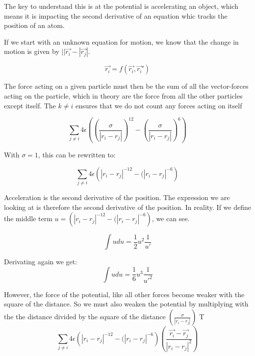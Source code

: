 The key to understand this is at the potential is accelerating an object, which means it is impacting the second derivative of an equation whic tracks the position of an atom.

If we start with an unknown equation for motion, we know that the change in motion is given by $|| \vec{r_i}  - | \vec{r_j}  | $. 

\begin{equation}
\vec{r_i} = f(\vec{r_i}, \vec{r_i}')
\end{equation}


The force acting on a given particle must then be the sum of all the vector-forces acting on the particle, which in theory are the force from all the other particles except itself. The $k \neq i$ ensures that we do not count any forces acting on itself

\begin{equation}
  \sum_{j \neq i} 4\epsilon \left(   (\frac{\sigma}{| r_i - r_j | })^{12} -   (\frac{\sigma}{| r_i - r_j | })^6 \right)
\end{equation}

With $\sigma = 1$, this can be rewritten to:

\begin{equation}
  \sum_{j \neq i} 4\epsilon \left(   | r_i - r_j |^{-12} -   (| r_i - r_j |^{-6} \right)
\end{equation}

Acceleration is the second derivative of the position. The expression we are looking at is therefore the second derivative of the position. In reality. If we define the middle term $u = \left(   | r_i - r_j |^{-12} -   (| r_i - r_j |^{-6} \right) $, we can see. 


\begin{equation}
\int  u du  = \frac{1}{2} u^2 \frac{1}{u'}
\end{equation}

Derivating again we get:
\begin{equation}
\int  u du  = \frac{1}{6} u^3 \frac{1}{u'^2}
\end{equation}

However, the force of the potential, like all other forces become weaker with the square of the distance. So we must also weaken the potential by multiplying with the the distance divided by the square of the distance $ (\frac{\sigma}{| r_i - r_j | })$ T
\begin{equation}
  \sum_{j \neq i} 4\epsilon \left(   | r_i - r_j |^{-12} -   (| r_i - r_j |^{-6} \right) (\frac{\vec{r_i} - \vec{r_j}}{| r_i - r_j |^2}) 
\end{equation}


